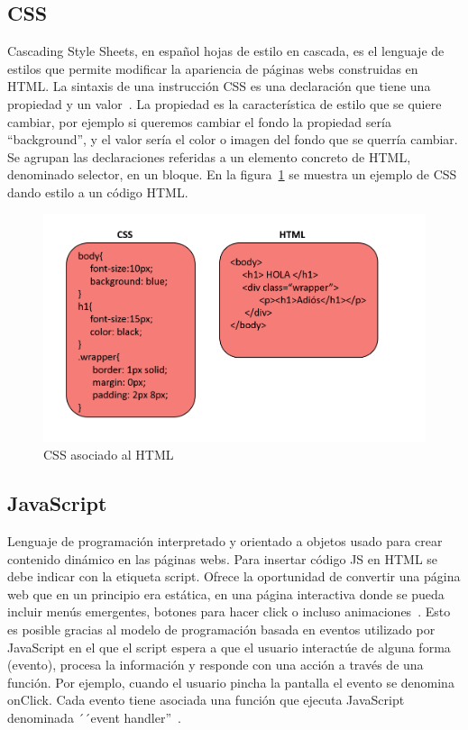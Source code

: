 \documentclass[a4paper, 12pt]{book}
\begin{document}
\subsection{CSS}
Cascading Style Sheets, en español hojas de estilo en cascada, es el lenguaje de estilos que permite modificar la apariencia de páginas webs construidas en HTML. La sintaxis de una instrucción CSS es una declaración que tiene una propiedad y un valor~\cite{mdn}. La propiedad es la característica de estilo que se quiere cambiar, por ejemplo si queremos cambiar el fondo la propiedad sería ``background'', y el valor sería el color o imagen del fondo que se querría cambiar. Se agrupan las declaraciones referidas a un elemento concreto de HTML, denominado selector, en un bloque. En la figura~\ref{figura:css} se muestra un ejemplo de CSS dando estilo a un código HTML.

\begin{figure}[h]
        \centering
        \includegraphics[scale=0.4]{img/cssyhtml.PNG}
        \caption{CSS asociado al HTML}
        \label{figura:css}
\end{figure}
\subsection{JavaScript}
Lenguaje de programación interpretado y orientado a objetos usado para crear contenido dinámico en las páginas webs. Para insertar código JS en HTML se debe indicar con la etiqueta script.  Ofrece la oportunidad de convertir una página web que en un principio era estática, en una página interactiva donde se pueda incluir menús emergentes, botones para hacer click o incluso animaciones~\cite{mdn1}. Esto es posible gracias al modelo de programación basada en eventos utilizado por JavaScript en el que el script espera a que el usuario interactúe de alguna forma (evento), procesa la información y responde con una acción a través de una función. Por ejemplo, cuando el usuario pincha la pantalla el evento se denomina onClick. Cada evento tiene asociada una función que ejecuta JavaScript denominada ´´event handler''~\cite{perez2019introduccion}.
\end{document}
